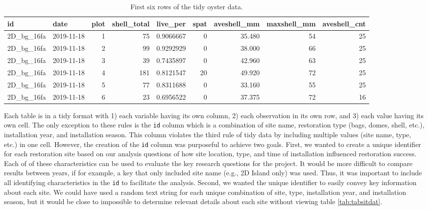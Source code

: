\documentclass[
]{book}
\begin{document}
\begin{table}

\caption{\label{tab:taboysdat}First six rows of the tidy oyster data.}
\centering
\begin{tabular}[t]{l|l|r|r|r|r|r|r|r}
\hline
id & date & plot & shell\_total & live\_per & spat & aveshell\_mm & maxshell\_mm & aveshell\_cnt\\
\hline
2D\_bg\_16fa & 2019-11-18 & 1 & 75 & 0.9066667 & 0 & 35.480 & 54 & 25\\
\hline
2D\_bg\_16fa & 2019-11-18 & 2 & 99 & 0.9292929 & 0 & 38.000 & 66 & 25\\
\hline
2D\_bg\_16fa & 2019-11-18 & 3 & 39 & 0.7435897 & 0 & 42.960 & 63 & 25\\
\hline
2D\_bg\_16fa & 2019-11-18 & 4 & 181 & 0.8121547 & 20 & 49.920 & 72 & 25\\
\hline
2D\_bg\_16fa & 2019-11-18 & 5 & 77 & 0.8311688 & 0 & 33.160 & 55 & 25\\
\hline
2D\_bg\_16fa & 2019-11-18 & 6 & 23 & 0.6956522 & 0 & 37.375 & 72 & 16\\
\hline
\end{tabular}
\end{table}

Each table is in a tidy format with 1) each variable having its own column, 2) each observation in its own row, and 3) each value having its own cell. The only exception to these rules is the \texttt{id} column which is a combination of site name, restoration type (bags, domes, shell, etc.), installation year, and installation season. This column violates the third rule of tidy data by including multiple values (site name, type, etc.) in one cell. However, the creation of the \texttt{id} column was purposeful to achieve two goals. First, we wanted to create a unique identifier for each restoration site based on our analysis questions of how site location, type, and time of installation influenced restoration success. Each of of these characteristics can be used to evaluate the key research questions for the project. It would be more difficult to compare results between years, if for example, a key that only included site name (e.g., 2D Island only) was used. Thus, it was important to include all identifying characteristics in the \texttt{id} to facilitate the analysis. Second, we wanted the unique identifier to easily convey key information about each site. We could have used a random text string for each unique combination of site, type, installation year, and installation season, but it would be close to impossible to determine relevant details about each site without viewing table \ref{tab:tabsitdat}.
\end{document}
